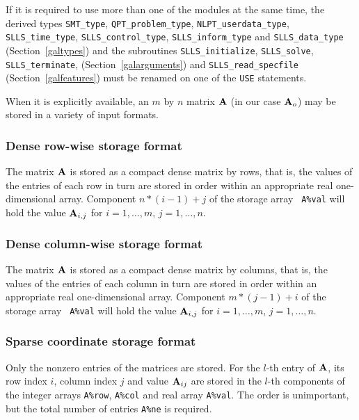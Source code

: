 \documentclass{galahad}
\newcommand{\packagename}{SLLS}
\begin{document}
\noindent
If it is required to use more than one of the modules at the same time, 
the derived types
{\tt SMT\_type},
{\tt QPT\_problem\_type},
{\tt NLPT\_userdata\-\_type},
{\tt \packagename\_time\_type},
{\tt \packagename\_control\_type},
{\tt \packagename\_inform\_type}
and
{\tt \packagename\_data\_type}
(Section~\ref{galtypes})
and the subroutines
{\tt \packagename\_initialize},
{\tt \packagename\_\-solve},
{\tt \packagename\_terminate},
(Section~\ref{galarguments})
and
{\tt \packagename\_read\_specfile}
(Section~\ref{galfeatures})
must be renamed on one of the {\tt USE} statements.


\galmatrix
When it is explicitly available, an $m$ by $n$ matrix ${\mathbf{A}}$ 
(in our case ${\mathbf{A}}_o$) may be stored in a variety of input formats.

\subsubsection{Dense row-wise storage format}\label{dense-row}
The matrix ${\mathbf{A}}$ is stored as a compact dense matrix by rows,
that is, the values of the entries of each row in turn are
stored in order within an appropriate real one-dimensional array.
Component $n \ast (i-1) + j$ of the storage array {\tt
  A\%val} will hold the value ${\mathbf{A}}_{i,j}$ for $i = 1, \ldots , m$, $j =
1, \ldots , n$.

\subsubsection{Dense column-wise storage format}\label{dense-column}
The matrix ${\mathbf{A}}$ is stored as a compact
dense matrix by columns, that is, the values of the entries of each column
in turn are stored in order within an appropriate real one-dimensional array.
Component $m \ast (j-1) + i$ of the storage array {\tt
  A\%val} will hold the value ${\mathbf{A}}_{i,j}$ for $i = 1, \ldots , m$, $j =
1, \ldots , n$.

\subsubsection{Sparse coordinate storage format}\label{coordinate}
Only the nonzero entries of the matrices are stored. For the $l$-th
entry of ${\mathbf{A}}$, its row index $i$, column index $j$ and value
${\mathbf{A}}_{ij}$ are stored in the $l$-th components of the integer arrays
{\tt A\%row}, {\tt A\%col} and real array {\tt A\%val}.
The order is unimportant, but the total number of entries {\tt A\%ne} is
required.
\end{document}
